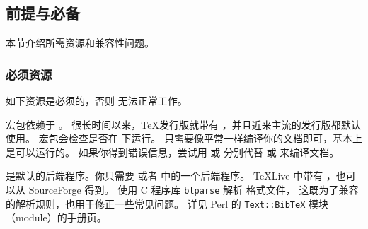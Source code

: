 \subsection{前提与必备}
\label{int:pre}

本节介绍所需资源和兼容性问题。

\subsubsection{必须资源}
\label{int:pre:req}


如下资源是必须的，否则 \biblatex 无法正常工作。

\begin{marglist}

\item[\eTeX]
\biblatex 宏包依赖于 \eTeX 。
很长时间以来，\TeX 发行版就带有 \eTeX ，并且近来主流的发行版都默认使用。
\biblatex 宏包会检查是否在 \eTeX 下运行。
只需要像平常一样编译你的文档即可，基本上是可以运行的。
如果你得到错误信息，尝试用  或  分别代替  或  来编译文档。

\item[\biber]
\biber 是\biblatex 默认的后端程序。你只需要 \BibTeX 或者 \biber 中的一个后端程序。
\TeX Live 中带有 \biber ，也可以从 SourceForge 得到。
\biber 使用 C 程序库 \texttt{btparse} 解析 \BibTeX 格式文件，
这既为了兼容 \BibTeX 的解析规则，也用于修正一些常见问题。
详见 Perl 的 \texttt{Text::BibTeX} 模块（module）的手册页。


\end{marglist}
